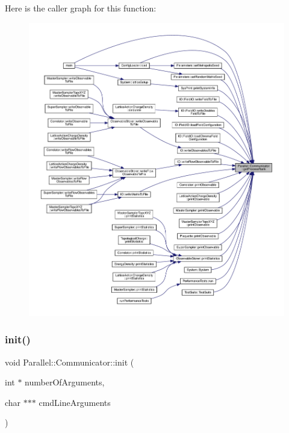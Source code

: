 Here is the caller graph for this function\+:\nopagebreak
\begin{figure}[H]
\begin{center}
\leavevmode
\includegraphics[width=350pt]{class_parallel_1_1_communicator_a474ab433da0e83ef372d74e26a7e5cb0_icgraph}
\end{center}
\end{figure}
\mbox{\label{class_parallel_1_1_communicator_adc9248c5a0defbbf55bfca988bfd9e96}} 
\subsubsection{\texorpdfstring{init()}{init()}}
{\footnotesize\ttfamily void Parallel\+::\+Communicator\+::init (\begin{DoxyParamCaption}\item[{int $\ast$}]{number\+Of\+Arguments,  }\item[{char $\ast$$\ast$$\ast$}]{cmd\+Line\+Arguments }\end{DoxyParamCaption})\hspace{0.3cm}{\ttfamily [static]}}

